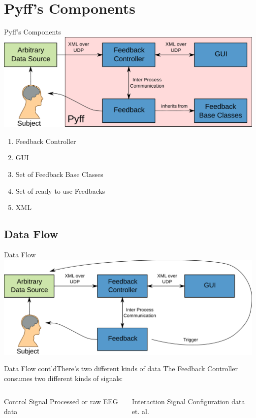 \documentclass{beamer}
\begin{document}
\section{Pyff's Components}
\begin{frame}{Pyff's Components}
    \includegraphics[width=\linewidth]{pyff_overview}
    \vfill
    \begin{enumerate}
        \item Feedback Controller
        \item GUI
        \item Set of Feedback Base Classes
        \item Set of ready-to-use Feedbacks
        \item XML
    \end{enumerate}
\end{frame}

\subsection{Data Flow}
\begin{frame}{Data Flow}
    \includegraphics[width=\linewidth]{pyff_data_flow}
\end{frame}

\begin{frame}{Data Flow cont'd}{There's two different kinds of data}
    The Feedback Controller consumes two different kinds of signals:
    \begin{columns}
            \begin{block}{Control Signal}
                Processed or raw EEG data
            \end{block}
            \begin{block}{Interaction Signal}
                Configuration data et. al.
            \end{block}
    \end{columns}
\end{frame}
\end{document}
